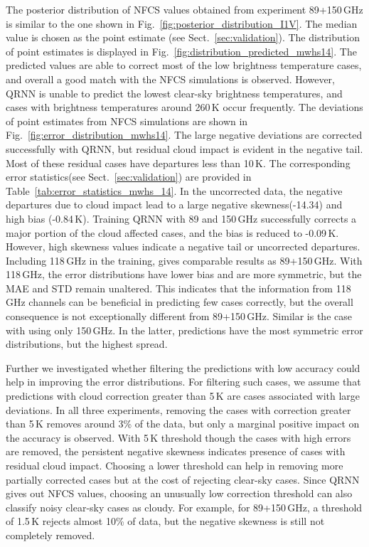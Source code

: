\documentclass[amt, manuscript]{copernicus}
\begin{document}
The posterior distribution of NFCS values obtained from experiment 89+150\,GHz is similar to the one shown in Fig.~\ref{fig:posterior_distribution_I1V}. The median value is chosen as the point estimate (see Sect.~\ref{sec:validation}). The distribution of point estimates is displayed in Fig.~\ref{fig:distribution_predicted_mwhs14}. The predicted values are able to correct most of the low brightness temperature cases, and overall a good match with the NFCS simulations is observed. However, QRNN is unable to predict the lowest clear-sky brightness temperatures, and cases with brightness temperatures around 260\,K occur frequently. The deviations of point estimates from NFCS simulations are shown in Fig.~\ref{fig:error_distribution_mwhs14}. The large negative deviations are corrected successfully with QRNN, but residual cloud impact is evident in the negative tail. Most of these residual cases have departures less than 10\,K. The corresponding error statistics(see Sect.~\ref{sec:validation}) are provided in  Table~\ref{tab:error_statistics_mwhs_14}. In the uncorrected data, the negative departures due to cloud impact lead to a large negative skewness(-14.34) and high bias (-0.84\,K). Training QRNN with 89 and 150\,GHz successfully corrects a major portion of the cloud affected cases, and the bias is reduced to -0.09\,K. However, high skewness values indicate a negative tail or uncorrected departures. Including 118\,GHz in the training, gives comparable results as 89+150\,GHz. With 118\,GHz, the error distributions have lower bias and are more symmetric, but the MAE and STD remain unaltered. This indicates that the information from 118\,GHz channels can be beneficial in predicting few cases correctly, but the overall consequence is not exceptionally different from 89+150\,GHz. Similar is the case with using only 150\,GHz. In the latter, predictions have the most symmetric error distributions, but the highest spread. 

Further we investigated whether filtering the predictions with low accuracy could help in improving the error distributions. For filtering such cases, we assume that predictions with cloud correction greater than 5\,K are cases associated with large deviations. In all three experiments, removing the cases with correction greater than 5\,K removes around 3\% of the data, but only a marginal positive impact on the accuracy is observed. With 5\,K threshold though the cases with high errors are removed, the persistent negative skewness indicates presence of cases with residual cloud impact. Choosing a lower threshold can help in removing more partially corrected cases but at the cost of rejecting clear-sky cases. Since QRNN gives out NFCS values, choosing an unusually low correction threshold can also classify noisy clear-sky cases as cloudy. For example, for 89+150\,GHz, a threshold of 1.5\,K rejects almost 10\% of data, but the negative skewness is still not completely removed. 
\end{document}
